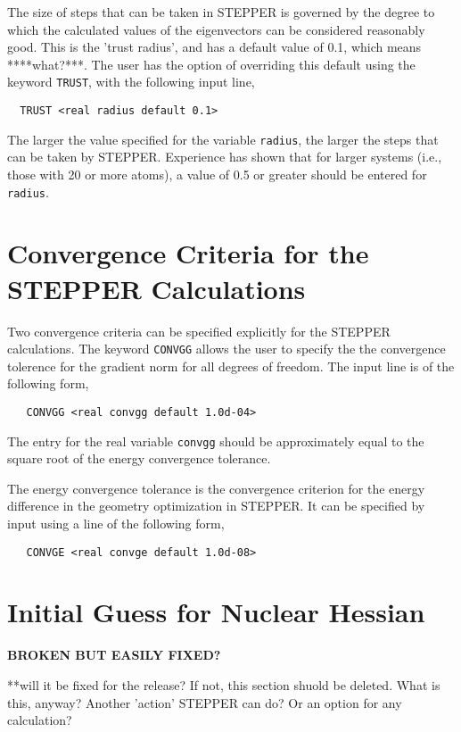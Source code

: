 
The size of steps that can be taken in STEPPER is governed by the degree
to which the calculated values of the eigenvectors can be considered 
reasonably good.  This is the 'trust radius', and has a default value of
0.1, which means ****what?***.  The user has the option of overriding this
default using the keyword \verb+TRUST+, with the following input line,

\begin{verbatim}
  TRUST <real radius default 0.1>
\end{verbatim}


The larger the value specified for the variable \verb+radius+, the larger 
the steps that can be taken by STEPPER. Experience has shown that for
larger systems (i.e., those with 20 or more atoms), a value of 0.5 or
greater should be entered for \verb+radius+.

\section{Convergence Criteria for the STEPPER Calculations}

Two convergence criteria can be specified explicitly for the 
STEPPER calculations.  The keyword \verb+CONVGG+ allows the user to
specify the the convergence tolerence for the gradient norm for
all degrees of freedom.  The input line is of the following form,

\begin{verbatim}
   CONVGG <real convgg default 1.0d-04>
\end{verbatim}

The entry for the real variable \verb+convgg+ should be approximately 
equal to the square root of the energy convergence tolerance.

The energy convergence tolerance is the convergence criterion for the 
energy difference in the geometry optimization in STEPPER.  It can be
specified by input using a line of the following form,

\begin{verbatim}
   CONVGE <real convge default 1.0d-08>
\end{verbatim}


\section{Initial Guess for Nuclear Hessian}

{\bf BROKEN BUT EASILY FIXED?}

\Large
**will it be fixed for the release?  If not, this section shuold
be deleted.  What is this, anyway?  Another 'action' STEPPER can do?
Or an option for any calculation?
\normalsize

